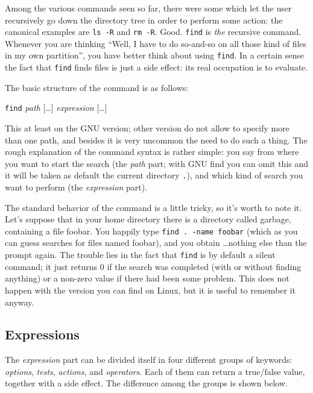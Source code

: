 Among the various commands seen so far, there were some which let the user
recursively go down the directory tree in order to perform some action: the
canonical examples are {\tt ls -R} and {\tt rm -R}. Good.  {\tt find} is
{\em the} recursive command. Whenever you are thinking ``Well, I have to do
so-and-so on all those kind of files in my own partition'', you have better
think about using {\tt find}. In a certain sense the fact that {\tt find}
finds files is just a side effect: its real occupation is to evaluate.


The basic structure of the command is as follows:

\begin{command}
{\tt find} {\em path} [\ldots] {\em expression} [\ldots]
\end{command}

This at least on the GNU version; other version do not allow to specify
more than one path, and besides it is very uncommon the need to do such a
thing. The rough explanation of the command syntax is rather simple: you
say from where you want to start the search (the {\em path} part;
with GNU find you can omit this and it will be taken as default the
current directory {\tt .}), and which kind of search you want to
perform (the {\em expression} part). 

The standard behavior of the command is a little tricky, so it's worth to
note it. Let's suppose that in your home directory there is a directory
called garbage, containing a file foobar. You happily type {\tt find .\
-name foobar} (which as you can guess searches for files named foobar), and
you obtain \ldots nothing else than the prompt again. The trouble lies in
the fact that {\tt find} is by default a silent command; it just returns 0
if the search was completed (with or without finding anything) or a
non-zero value if there had been some problem. This does not happen with
the version you can find on Linux, but it is useful to remember it anyway.

\subsection{Expressions}

The {\em expression} part can be divided itself in four different groups
of keywords: {\em options}, {\em tests}, {\em actions}, and {\em
operators}. Each of them can return a true/false value, together with a
side effect. The difference among the groups is shown below.

